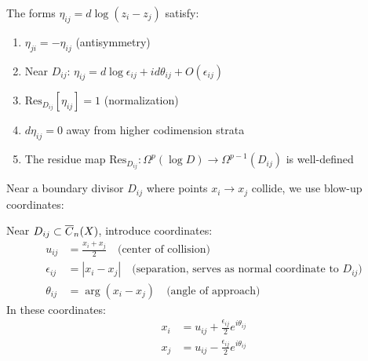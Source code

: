 \begin{proposition}
The forms $\eta_{ij} = d\log(z_i - z_j)$ satisfy:
\begin{enumerate}
\item $\eta_{ji} = -\eta_{ij}$ (antisymmetry)
\item Near $D_{ij}$: $\eta_{ij} = d\log\epsilon_{ij} + id\theta_{ij} + O(\epsilon_{ij})$
\item $\text{Res}_{D_{ij}}[\eta_{ij}] = 1$ (normalization)
\item $d\eta_{ij} = 0$ away from higher codimension strata
\item The residue map $\text{Res}_{D_{ij}}: \Omega^p(\log D) \to \Omega^{p-1}(D_{ij})$ is well-defined
\end{enumerate}
\end{proposition}

Near a boundary divisor $D_{ij}$ where points $x_i \to x_j$ collide, we use blow-up coordinates:
 
\begin{definition}\label{def:blowup}
Near $D_{ij} \subset \overline{C}_n(X)$, introduce coordinates:
\begin{align}
u_{ij} &= \frac{x_i + x_j}{2} \quad \text{(center of collision)} \\
\epsilon_{ij} &= |x_i - x_j| \quad \text{(separation, serves as normal coordinate to } D_{ij}) \\
\theta_{ij} &= \arg(x_i - x_j) \quad \text{(angle of approach)}
\end{align}
In these coordinates:
\begin{align}
x_i &= u_{ij} + \frac{\epsilon_{ij}}{2}e^{i\theta_{ij}} \\
x_j &= u_{ij} - \frac{\epsilon_{ij}}{2}e^{i\theta_{ij}}
\end{align}
\end{definition}

